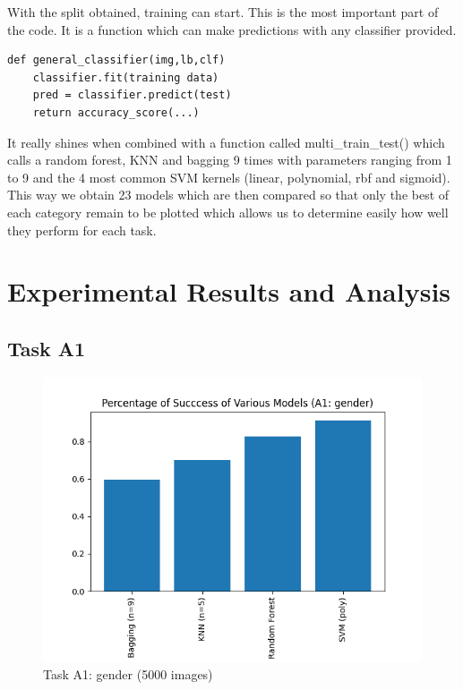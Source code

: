 \documentclass[a4paper,12pt,twoside,twocolumn]{article}
\begin{document}
With the split obtained, training can start. This is the most important part of the code. It is a function which can make predictions with any classifier provided.\\

\lstset{language=Python,label= ,caption= ,captionpos=b,numbers=none}
\begin{lstlisting}
def general_classifier(img,lb,clf)    
    classifier.fit(training data)
    pred = classifier.predict(test)
    return accuracy_score(...)
\end{lstlisting}

It really shines when combined with a function called multi\_train\_test() which calls a random forest, KNN and bagging 9 times with parameters ranging from 1 to 9 and the 4 most common SVM kernels (linear, polynomial, rbf and sigmoid).\\

This way we obtain 23 models which are then compared so that only the best of each category remain to be plotted which allows us to determine easily how well they perform for each task.\\

\section{Experimental Results and Analysis}
\label{sec:orgad48b21}
\subsection{Task A1}
\label{sec:org07506da}

\begin{center}
\begin{figure}[htbp]
\centering
\includegraphics[width=.9\linewidth]{./images/A1: gender.png}
\caption{Task A1: gender (5000 images)}
\end{figure}
\end{center}
\end{document}

